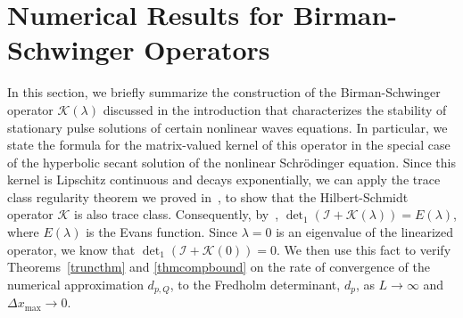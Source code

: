\documentclass{birkjour}
\theoremstyle{definition}
\theoremstyle{remark}
\numberwithin{equation}{section}
\begin{document}
\section{Numerical Results for Birman-Schwinger Operators}\label{sec:Results}


In this section, we briefly summarize the construction of the Birman-Schwinger operator 
$\mathcal K(\lambda)$ discussed in the introduction that characterizes the stability of stationary pulse solutions
of certain nonlinear waves equations. In particular, we 
state the formula for the matrix-valued kernel of this operator in the special case of the hyperbolic secant solution of the nonlinear Schr\"odinger equation. 
Since this  kernel  is Lipschitz continuous and decays exponentially, we can apply the trace class regularity theorem we proved in~\cite{zweck2024regularity}, to show that the Hilbert-Schmidt operator $\mathcal K$ 
is also trace class. Consequently, by~\cite{EJF}, 
$\operatorname{det}_1 (\mathcal I+\mathcal K(\lambda)) = E(\lambda)$, where
$E(\lambda)$ is the Evans function. 
Since  $\lambda=0$ is an eigenvalue of the linearized
operator, we know that $\operatorname{det}_1 (\mathcal I+\mathcal K(0)) = 0$. 
We then use this fact to verify Theorems~\ref{truncthm} and \ref{thmcompbound}
on the rate of convergence of the numerical approximation 
$d_{p,Q}$, to the Fredholm determinant, $d_p$, as $L\to\infty$ and 
$\Delta x_{\operatorname{max}}\to 0$.  
\end{document}
